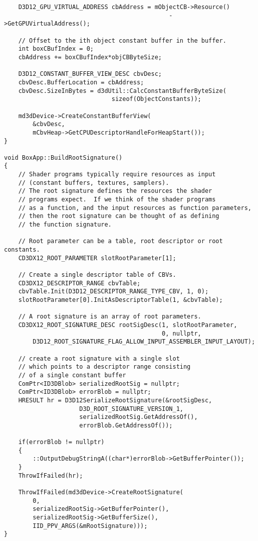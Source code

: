 \begin{lstlisting}
    D3D12_GPU_VIRTUAL_ADDRESS cbAddress = mObjectCB->Resource()
                                              ->GetGPUVirtualAddress();

    // Offset to the ith object constant buffer in the buffer.
    int boxCBufIndex = 0;
    cbAddress += boxCBufIndex*objCBByteSize;

    D3D12_CONSTANT_BUFFER_VIEW_DESC cbvDesc;
    cbvDesc.BufferLocation = cbAddress;
    cbvDesc.SizeInBytes = d3dUtil::CalcConstantBufferByteSize(
                              sizeof(ObjectConstants));

    md3dDevice->CreateConstantBufferView(
        &cbvDesc,
        mCbvHeap->GetCPUDescriptorHandleForHeapStart());
}

void BoxApp::BuildRootSignature()
{
    // Shader programs typically require resources as input 
    // (constant buffers, textures, samplers).  
    // The root signature defines the resources the shader
    // programs expect.  If we think of the shader programs 
    // as a function, and the input resources as function parameters,
    // then the root signature can be thought of as defining
    // the function signature.  

    // Root parameter can be a table, root descriptor or root constants.
    CD3DX12_ROOT_PARAMETER slotRootParameter[1];

    // Create a single descriptor table of CBVs.
    CD3DX12_DESCRIPTOR_RANGE cbvTable;
    cbvTable.Init(D3D12_DESCRIPTOR_RANGE_TYPE_CBV, 1, 0);
    slotRootParameter[0].InitAsDescriptorTable(1, &cbvTable);

    // A root signature is an array of root parameters.
    CD3DX12_ROOT_SIGNATURE_DESC rootSigDesc(1, slotRootParameter, 
                                            0, nullptr, 
        D3D12_ROOT_SIGNATURE_FLAG_ALLOW_INPUT_ASSEMBLER_INPUT_LAYOUT);

    // create a root signature with a single slot
    // which points to a descriptor range consisting 
    // of a single constant buffer
    ComPtr<ID3DBlob> serializedRootSig = nullptr;
    ComPtr<ID3DBlob> errorBlob = nullptr;
    HRESULT hr = D3D12SerializeRootSignature(&rootSigDesc, 
                     D3D_ROOT_SIGNATURE_VERSION_1,
                     serializedRootSig.GetAddressOf(), 
                     errorBlob.GetAddressOf());

    if(errorBlob != nullptr)
    {
        ::OutputDebugStringA((char*)errorBlob->GetBufferPointer());
    }
    ThrowIfFailed(hr);

    ThrowIfFailed(md3dDevice->CreateRootSignature(
        0,
        serializedRootSig->GetBufferPointer(),
        serializedRootSig->GetBufferSize(),
        IID_PPV_ARGS(&mRootSignature)));
}


\end{lstlisting}
